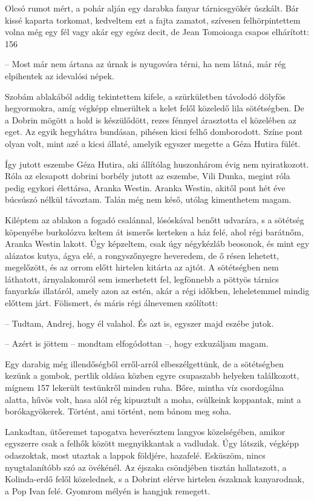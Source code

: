 \documentclass{IEEEtran}
\begin{document}
Olcsó rumot mért, a pohár alján egy darabka fanyar tárnicsgyökér úszkált. Bár
kissé kaparta torkomat, kedveltem ezt a fajta zamatot, szívesen
felhörpintettem volna még egy fél vagy akár egy egész decit, de Jean Tomoioaga
csapos elhárított:
156

– Most már nem ártana az úrnak is nyugovóra térni, ha nem látná, már rég
elpihentek az idevalósi népek.

Szobám ablakából addig tekintettem kifele, a szürkületben távolodó dölyfös
hegyormokra, amíg végképp elmerültek a kelet felől közeledő lila sötétségben.
De a Dobrin mögött a hold is készülődött, rezes fénnyel árasztotta el
közelében az eget. Az egyik hegyhátra bundásan, pihésen kicsi felhő
domborodott. Színe pont olyan volt, mint azé a kicsi állaté, amelyik egyszer
megette a Géza Hutira fülét.

Így jutott eszembe Géza Hutira, aki állítólag huszonhárom évig nem
nyiratkozott. Róla az elcsapott dobrini borbély jutott az eszembe, Vili Dunka,
megint róla pedig egykori élettársa, Aranka Westin. Aranka Westin, akitől pont
hét éve búcsúszó nélkül távoztam. Talán még nem késő, utólag kimenthetem
magam.

Kiléptem az ablakon a fogadó csalánnal, lósóskával benőtt udvarára, s a
sötétség köpenyébe burkolózva keltem át ismerős kerteken a ház felé, ahol régi
barátnőm, Aranka Westin lakott. Úgy képzeltem, csak úgy négykézláb beosonok,
és mint egy alázatos kutya, ágya elé, a rongyszőnyegre heveredem, de ő résen
lehetett, megelőzött, és az orrom előtt hirtelen kitárta az ajtót. A
sötétségben nem láthatott, árnyalakomról sem ismerhetett fel, legfönnebb a
pöttyös tárnics fanyarkás illatáról, amely azon az estén, akár a régi időkben,
leheletemmel mindig előttem járt. Fölismert, és máris régi álnevemen
szólított:

– Tudtam, Andrej, hogy él valahol. És azt is, egyszer majd eszébe jutok.

– Azért is jöttem – mondtam elfogódottan –, hogy exkuzáljam magam.

Egy darabig még illendőségből erről-arról elbeszélgettünk, de a sötétségben
kezünk a gombok, pertlik oldása közben egyre csupaszabb helyeken találkozott,
mígnem 157 lekerült testünkről minden ruha. Bőre, mintha víz csordogálna
alatta, hűvös volt, hasa alól rég kipusztult a moha, csülkeink koppantak, mint
a borókagyökerek. Történt, ami történt, nem bánom meg soha.

Lankadtan, ütőeremet tapogatva heverésztem langyos közelségében, amikor
egyszerre csak a felhők között megnyikkantak a vadludak. Úgy látszik, végképp
odaszoktak, most utaztak a lappok földjére, hazafelé. Esküszöm, nincs
nyugtalanítóbb szó az övékénél. Az éjszaka csöndjében tisztán hallatszott, a
Kolinda-erdő felől közelednek, s a Dobrint elérve hirtelen északnak
kanyarodnak, a Pop Ivan felé. Gyomrom mélyén is hangjuk remegett.
\end{document}
